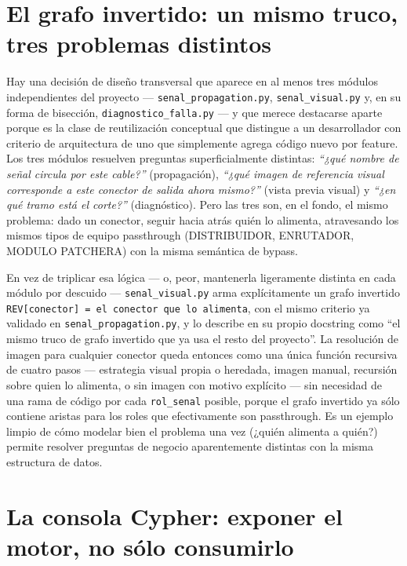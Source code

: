 \documentclass[11pt,twocolumn]{article}
\begin{document}
\section{El grafo invertido: un mismo truco, tres problemas distintos}

Hay una decisión de diseño transversal que aparece en al menos tres módulos independientes del proyecto --- \texttt{senal\_propagation.py}, \texttt{senal\_visual.py} y, en su forma de bisección, \texttt{diagnostico\_falla.py} --- y que merece destacarse aparte porque es la clase de reutilización conceptual que distingue a un desarrollador con criterio de arquitectura de uno que simplemente agrega código nuevo por feature. Los tres módulos resuelven preguntas superficialmente distintas: \emph{``¿qué nombre de señal circula por este cable?''} (propagación), \emph{``¿qué imagen de referencia visual corresponde a este conector de salida ahora mismo?''} (vista previa visual) y \emph{``¿en qué tramo está el corte?''} (diagnóstico). Pero las tres son, en el fondo, el mismo problema: dado un conector, seguir hacia atrás quién lo alimenta, atravesando los mismos tipos de equipo passthrough (DISTRIBUIDOR, ENRUTADOR, MODULO PATCHERA) con la misma semántica de bypass.

En vez de triplicar esa lógica --- o, peor, mantenerla ligeramente distinta en cada módulo por descuido --- \texttt{senal\_visual.py} arma explícitamente un grafo invertido \texttt{REV[conector] = el conector que lo alimenta}, con el mismo criterio ya validado en \texttt{senal\_propagation.py}, y lo describe en su propio docstring como ``el mismo truco de grafo invertido que ya usa el resto del proyecto''. La resolución de imagen para cualquier conector queda entonces como una única función recursiva de cuatro pasos --- estrategia visual propia o heredada, imagen manual, recursión sobre quien lo alimenta, o sin imagen con motivo explícito --- sin necesidad de una rama de código por cada \texttt{rol\_senal} posible, porque el grafo invertido ya sólo contiene aristas para los roles que efectivamente son passthrough. Es un ejemplo limpio de cómo modelar bien el problema una vez (¿quién alimenta a quién?) permite resolver preguntas de negocio aparentemente distintas con la misma estructura de datos.

\section{La consola Cypher: exponer el motor, no sólo consumirlo}
\end{document}
